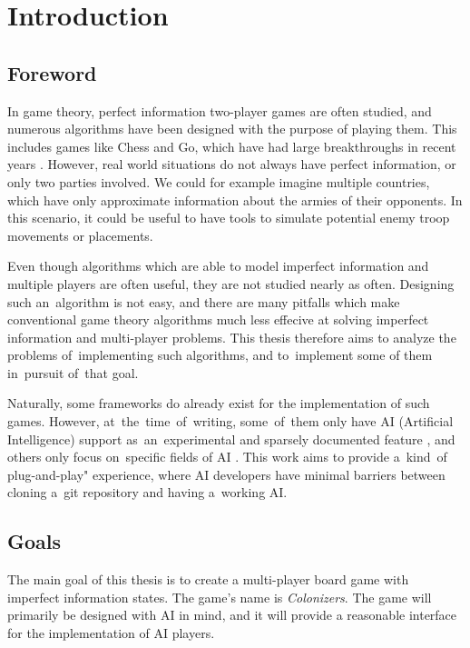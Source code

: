 \chapter*{Introduction}

\section*{Foreword}

In game theory, perfect information two-player games are often
studied, and numerous algorithms have been designed with the purpose
of playing them. This includes games like Chess and Go, which have had
large breakthroughs in recent years \cite{Silver16}. However, real world
situations do not always have perfect information, or only two parties involved.
We could for example imagine multiple countries, which have only approximate
information about the armies of their opponents. In this scenario, it could be
useful to have tools to simulate potential enemy troop movements or placements.

Even though algorithms which are able to model imperfect information and multiple
players are often useful, they are not studied nearly as often. Designing such
an~algorithm is not easy, and there are many pitfalls which make conventional
game theory algorithms much less effecive at solving imperfect information and
multi-player problems. This thesis therefore aims to analyze the problems
of~implementing such algorithms, and to~implement some of them in~pursuit of~that goal.

Naturally, some frameworks do already exist for the implementation of such games.
However, at~the~time~of~writing, some~of~them only have AI (Artificial Intelligence)
support as~an~experimental and sparsely documented feature \cite{Boardgameio},
and others only focus on~specific fields of AI \cite{Openaigym}. This work aims to provide 
a~kind~of plug-and-play" experience, where AI developers have minimal barriers between
cloning a~git repository and having a~working AI.

\section*{Goals}

The main goal of this thesis is to create a multi-player board game with
imperfect information states. The game's name is \emph{Colonizers}. The game will primarily be designed with AI
in mind, and it will provide a reasonable interface for
the implementation of AI players.

